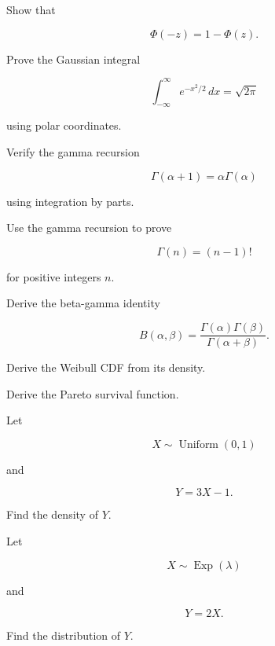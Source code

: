 \begin{exercise}[3]
Show that

\[
\Phi(-z)=1-\Phi(z).
\]
\end{exercise}

\begin{exercise}[3]
Prove the Gaussian integral

\[
\int_{-\infty}^{\infty}
e^{-x^2/2}\,dx
=
\sqrt{2\pi}
\]

using polar coordinates.
\end{exercise}

\begin{exercise}[3]
Verify the gamma recursion

\[
\Gamma(\alpha+1)
=
\alpha\Gamma(\alpha)
\]

using integration by parts.
\end{exercise}

\begin{exercise}[3]
Use the gamma recursion to prove

\[
\Gamma(n)=(n-1)!
\]

for positive integers \(n\).
\end{exercise}

\begin{exercise}[3]
Derive the beta-gamma identity

\[
B(\alpha,\beta)
=
\frac{
\Gamma(\alpha)\Gamma(\beta)
}{
\Gamma(\alpha+\beta)
}.
\]
\end{exercise}

\begin{exercise}[3]
Derive the Weibull CDF from its density.
\end{exercise}

\begin{exercise}[3]
Derive the Pareto survival function.
\end{exercise}

\begin{exercise}[3]
Let

\[
X\sim\operatorname{Uniform}(0,1)
\]

and

\[
Y=3X-1.
\]

Find the density of \(Y\).
\end{exercise}

\begin{exercise}[3]
Let

\[
X\sim\operatorname{Exp}(\lambda)
\]

and

\[
Y=2X.
\]

Find the distribution of \(Y\).
\end{exercise}

